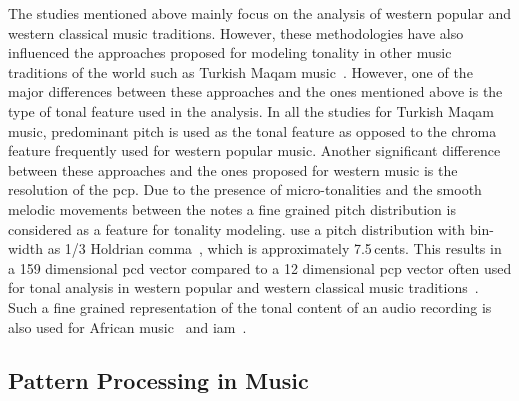 The studies mentioned above mainly focus on the analysis of western popular and western classical music traditions. However, these methodologies have also influenced the approaches proposed for modeling tonality in other music traditions of the world such as Turkish Maqam music~\cite{gedik2010pitch,gedik2009evaluation,bozkurt2008automatic}. However, one of the major differences between these approaches and the ones mentioned above is the type of tonal feature used in the analysis. In all the studies for Turkish Maqam music, predominant pitch is used as the tonal feature as opposed to the chroma feature frequently used for western popular music. Another significant difference between these approaches and the ones proposed for western music is the resolution of the \gls{pcp}. Due to the presence of micro-tonalities and the smooth melodic movements between the notes a fine grained pitch distribution is considered as a feature for tonality modeling. \cite{bozkurt2008automatic,gedik2010pitch} use a pitch distribution with bin-width as 1/3 Holdrian comma~\cite{akkocc2002non}, which is approximately 7.5\,cents. This results in a 159 dimensional \gls{pcd} vector compared to a 12 dimensional \gls{pcp} vector often used for tonal analysis in western popular and western classical music traditions~\cite{gomez2006tonal}. Such a fine grained representation of the tonal content of an audio recording is also used for African music~\citep{moelants2009exploring} and \acrfull{iam}~\citep{chordia2013joint}. 



\subsection{Pattern Processing in Music}
\label{sec:pattern_processin_in_music}


